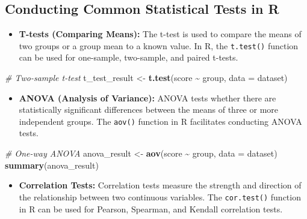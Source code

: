 \documentclass[
]{book}
\newenvironment{Shaded}{\begin{snugshade}}{\end{snugshade}}
\newcommand{\AttributeTok}[1]{\textcolor[rgb]{0.13,0.29,0.53}{#1}}
\newcommand{\CommentTok}[1]{\textcolor[rgb]{0.56,0.35,0.01}{\textit{#1}}}
\newcommand{\FunctionTok}[1]{\textcolor[rgb]{0.13,0.29,0.53}{\textbf{#1}}}
\newcommand{\NormalTok}[1]{#1}
\newcommand{\OtherTok}[1]{\textcolor[rgb]{0.56,0.35,0.01}{#1}}
\newcommand{\SpecialCharTok}[1]{\textcolor[rgb]{0.81,0.36,0.00}{\textbf{#1}}}
\providecommand{\tightlist}{%
  \setlength{\itemsep}{0pt}\setlength{\parskip}{0pt}}
\begin{document}
\hypertarget{conducting-common-statistical-tests-in-r}{%
\subsection*{Conducting Common Statistical Tests in R}\label{conducting-common-statistical-tests-in-r}}

\begin{itemize}
\tightlist
\item
  \textbf{T-tests (Comparing Means):} The t-test is used to compare the means of two groups or a group mean to a known value. In R, the \texttt{t.test()} function can be used for one-sample, two-sample, and paired t-tests.
\end{itemize}

\begin{Shaded}
\begin{Highlighting}[]
\CommentTok{\# Two{-}sample t{-}test}
\NormalTok{t\_test\_result }\OtherTok{\textless{}{-}} \FunctionTok{t.test}\NormalTok{(score }\SpecialCharTok{\textasciitilde{}}\NormalTok{ group, }\AttributeTok{data =}\NormalTok{ dataset)}
\end{Highlighting}
\end{Shaded}

\begin{itemize}
\tightlist
\item
  \textbf{ANOVA (Analysis of Variance):} ANOVA tests whether there are statistically significant differences between the means of three or more independent groups. The \texttt{aov()} function in R facilitates conducting ANOVA tests.
\end{itemize}

\begin{Shaded}
\begin{Highlighting}[]
\CommentTok{\# One{-}way ANOVA}
\NormalTok{anova\_result }\OtherTok{\textless{}{-}} \FunctionTok{aov}\NormalTok{(score }\SpecialCharTok{\textasciitilde{}}\NormalTok{ group, }\AttributeTok{data =}\NormalTok{ dataset)}
\FunctionTok{summary}\NormalTok{(anova\_result)}
\end{Highlighting}
\end{Shaded}

\begin{itemize}
\tightlist
\item
  \textbf{Correlation Tests:} Correlation tests measure the strength and direction of the relationship between two continuous variables. The \texttt{cor.test()} function in R can be used for Pearson, Spearman, and Kendall correlation tests.
\end{itemize}
\end{document}
